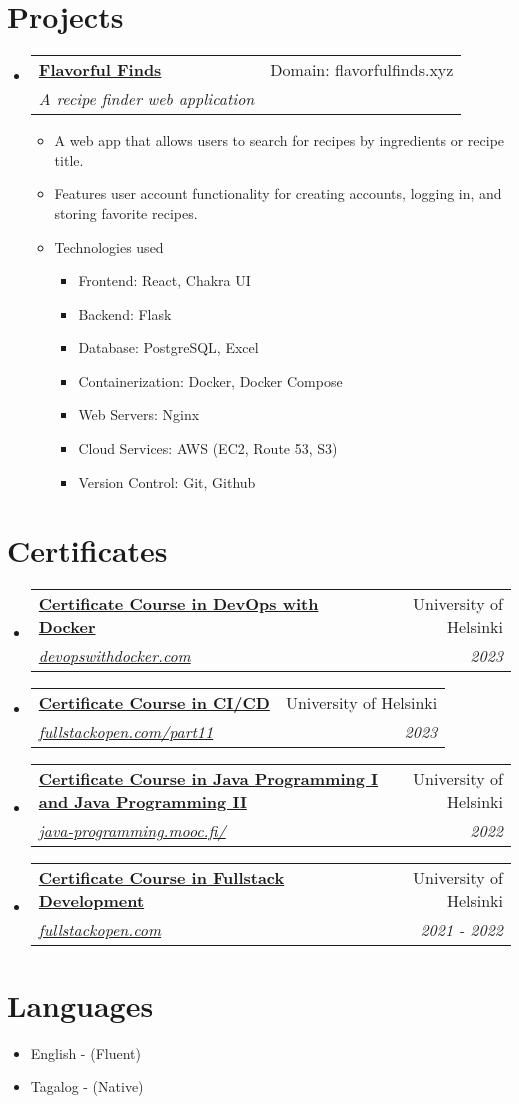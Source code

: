 \documentclass[letterpaper,11pt]{article}
\makeatletter
\newcommand{\resumeItem}[1]{\item\small{#1}}
\newcommand{\resumeSubheading}[4]{
  \vspace{-1pt}\item
    \begin{tabular*}{0.97\textwidth}[t]{l@{\extracolsep{\fill}}r}
      \textbf{#1} & #2 \\
      \textit{\small#3} & \textit{\small #4} \\
    \end{tabular*}\vspace{-5pt}
}
\newcommand{\resumeSubItem}[1]{\item{\small#1\vspace{-4pt}}}
\newcommand{\resumeSubHeadingListStart}{\begin{itemize}[leftmargin=*]}
\newcommand{\resumeSubHeadingListEnd}{\end{itemize}}
\newcommand{\resumeItemListStart}{\begin{itemize}}
\newcommand{\resumeItemListEnd}{\end{itemize}\vspace{-5pt}}
\makeatother
\begin{document}
\section{Projects}
\resumeSubHeadingListStart
\resumeSubheading
{\href{http://www.flavorfulfinds.xyz/}{Flavorful Finds}}{Domain: flavorfulfinds.xyz}
{A recipe finder web application}{}
\resumeItemListStart
\resumeItem
{A web app that allows users to search for recipes by ingredients or recipe title.}
\resumeItem
{Features user account functionality for creating accounts, logging in, and storing favorite recipes.}
\resumeSubItem
{Technologies used}
\resumeSubHeadingListStart
\resumeItem{Frontend: React, Chakra UI} 
\resumeItem{Backend: Flask} 
\resumeItem{Database: PostgreSQL, Excel}
\resumeItem{Containerization: Docker, Docker Compose} 
\resumeItem{Web Servers: Nginx}
\resumeItem{Cloud Services: AWS (EC2, Route 53, S3)} 
\resumeItem{Version Control: Git, Github}
\resumeSubHeadingListEnd
\resumeItemListEnd

\resumeSubHeadingListEnd

\section{Certificates}
\resumeSubHeadingListStart

\resumeSubheading
{\href{https://studies.cs.helsinki.fi/stats/api/certificate/docker2023/en/53830ae5415b59882a9ecb3bc8052552}
{Certificate Course in DevOps with Docker}}{University of Helsinki}
{\href{https://devopswithdocker.com}{devopswithdocker.com}}{2023}
\resumeSubheading
{\href{https://studies.cs.helsinki.fi/stats/api/certificate/fs-cicd/en/ced81c9b6eb5147f507b806893b95c4d}
{Certificate Course in CI/CD}}{University of Helsinki}
{\href{https://fullstackopen.com/en/part11}{fullstackopen.com/part11}}{2023}
\resumeSubheading
{\href{https://certificates.mooc.fi/validate/ynptl4uyzlh}
{Certificate Course in Java Programming I and Java Programming II}}{University of Helsinki}
{\href{https://java-programming.mooc.fi/}{java-programming.mooc.fi/}}{2022}
\resumeSubheading
{\href{https://studies.cs.helsinki.fi/stats/api/certificate/fullstackopen/en/d143d632300e29c5c498bce5528df5d7}{Certificate Course in Fullstack Development}}{University of Helsinki}
{\href{https://fullstackopen.com/en/}{fullstackopen.com}}{2021 - 2022}

\resumeSubHeadingListEnd

\section{Languages}
\resumeSubHeadingListStart
\resumeItem{English - (Fluent)} 
\resumeItem{Tagalog - (Native)}
\resumeSubHeadingListEnd
\end{document}
